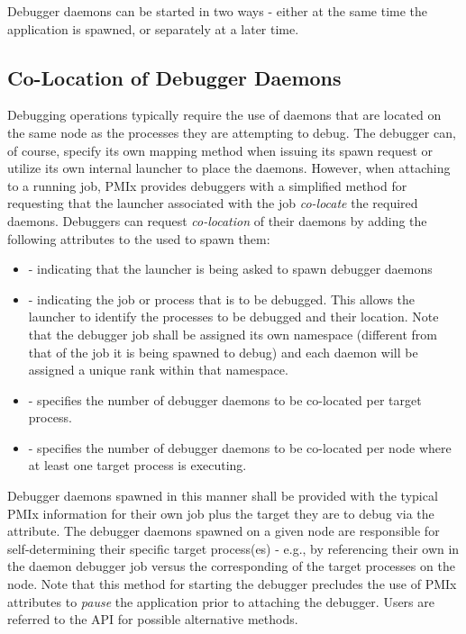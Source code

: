 Debugger daemons can be started in two ways - either at the same time the application is spawned, or separately at a later time.

\subsection{Co-Location of Debugger Daemons}
\label{chap:api_tools:colocate}

Debugging operations typically require the use of daemons that are located on
the same node as the processes they are attempting to debug. The debugger can,
of course, specify its own mapping method when issuing its spawn request or
utilize its own internal launcher to place the daemons. However, when attaching
to a running job, \ac{PMIx} provides debuggers with a simplified method for
requesting that the launcher associated with the job \emph{co-locate} the
required daemons. Debuggers can request \emph{co-location} of their daemons by
adding the following attributes to the  used to spawn them:

\begin{itemize}
    \item {} - indicating that the launcher is
    being asked to spawn debugger daemons
    \item {} - indicating the job or process that is
    to be debugged. This allows the launcher to identify the processes to be
    debugged and their location. Note that the debugger job shall be assigned
    its own namespace (different from that of the job it is being spawned
    to debug) and each daemon will be assigned a unique rank within that
    namespace.
    \item {} - specifies the number of
    debugger daemons to be co-located per target process.
    \item {} - specifies the number of
    debugger daemons to be co-located per node where at least one target
    process is executing.
\end{itemize}

Debugger daemons spawned in this manner shall be provided with the typical
\ac{PMIx} information for their own job plus the target they are to debug via
the  attribute. The debugger daemons spawned on a
given node are responsible for self-determining their specific target
process(es) - e.g., by referencing their own  in the
daemon debugger job versus the corresponding  of the
target processes on the node. Note that this method for starting the debugger
precludes the use of \ac{PMIx} attributes to \emph{pause} the application prior
to attaching the debugger. Users are referred to the 
\ac{API} for possible alternative methods.

